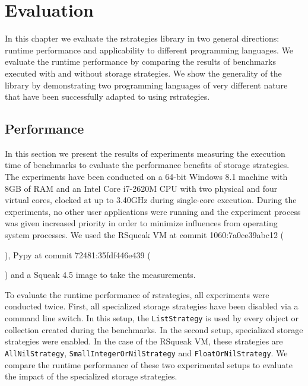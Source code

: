 \section{Evaluation}

In this chapter we evaluate the rstrategies library in two general directions: runtime performance and applicability to different programming languages.
We evaluate the runtime performance by comparing the results of benchmarks executed with and without storage strategies.
We show the generality of the library by demonstrating two programming languages of very different nature that have been successfully adapted to using rstrategies.







\subsection{Performance}

In this section we present the results of experiments measuring the execution time of benchmarks to evaluate the performance benefits of storage strategies.
The experiments have been conducted on a 64-bit Windows 8.1 machine with 8GB of RAM and an Intel Core i7-2620M CPU with two physical and four virtual cores, clocked at up to 3.40GHz during single-core execution.
During the experiments, no other user applications were running and the experiment process was given increased priority in order to minimize influences from operating system processes.
We used the RSqueak VM at commit 1060:7a0ce39abc12 (\date{16.10.2014}), Pypy at commit 72481:35fdf446e439 (\date{24.07.2014}) and a Squeak 4.5 image to take the measurements.

To evaluate the runtime performance of rstrategies, all experiments were conducted twice.
First, all specialized storage strategies have been disabled via a command line switch.
In this setup, the \lstinline{ListStrategy} is used by every object or collection created during the benchmarks.
In the second setup, specialized storage strategies were enabled.
In the case of the RSqueak VM, these strategies are \lstinline{AllNilStrategy}, \lstinline{SmallIntegerOrNilStrategy} and \lstinline{FloatOrNilStrategy}.
We compare the runtime performance of these two experimental setups to evaluate the impact of the specialized storage strategies.

